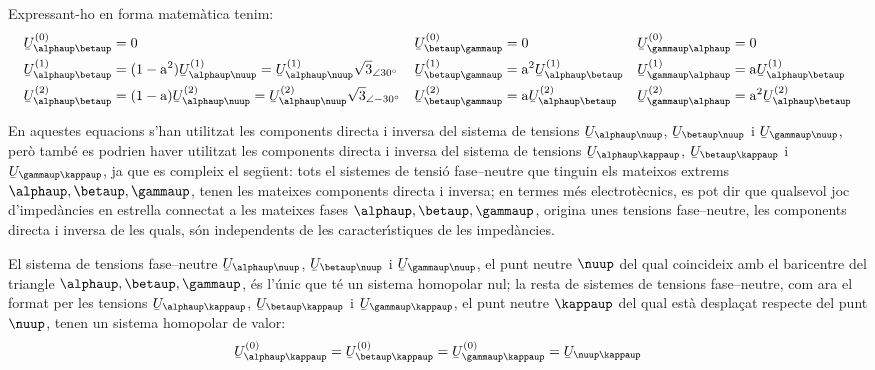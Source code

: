 Expressant-ho en forma matem\`{a}tica tenim:
\begin{subequations}
\begin{align}
   \cmplx{U}_{\alphaup\betaup}\ap{(0)} &= 0 &
   \cmplx{U}_{\betaup\gammaup}\ap{(0)} &= 0 &
   \cmplx{U}_{\gammaup\alphaup}\ap{(0)} &= 0 \\
   \cmplx{U}_{\alphaup\betaup}\ap{(1)} &= (1-\au^2) \cmplx{U}_{\alphaup\nuup}\ap{(1)} =
   \cmplx{U}_{\alphaup\nuup}\ap{(1)} \sqrt{3}_{\angle 30\degree} &
   \cmplx{U}_{\betaup\gammaup}\ap{(1)} &= \au^2 \cmplx{U}_{\alphaup\betaup}\ap{(1)} &
   \cmplx{U}_{\gammaup\alphaup}\ap{(1)} &= \au \cmplx{U}_{\alphaup\betaup}\ap{(1)} \label{eq:c_sim_a3} \\
   \cmplx{U}_{\alphaup\betaup}\ap{(2)} &= (1-\au) \cmplx{U}_{\alphaup\nuup}\ap{(2)}  =
   \cmplx{U}_{\alphaup\nuup}\ap{(2)} \sqrt{3}_{\angle -30\degree}&
   \cmplx{U}_{\betaup\gammaup}\ap{(2)} &= \au \cmplx{U}_{\alphaup\betaup}\ap{(2)} &
   \cmplx{U}_{\gammaup\alphaup}\ap{(2)} &= \au^2 \cmplx{U}_{\alphaup\betaup}\ap{(2)} \label{eq:c_sim_b3}
\end{align}
\end{subequations}

En aquestes equacions s'han utilitzat les components directa i
inversa del sistema de tensions
$\cmplx{U}_{\alphaup\nuup}$, $\cmplx{U}_{\betaup\nuup}$ i $\cmplx{U}_{\gammaup\nuup}$,
per\`{o} tamb\'{e} es podrien haver utilitzat les components directa i
inversa del sistema de tensions
$\cmplx{U}_{\alphaup\kappaup}$, $\cmplx{U}_{\betaup\kappaup}$ i $\cmplx{U}_{\gammaup\kappaup}$,
ja que es compleix el seg\"{u}ent: tots el sistemes de tensi\'{o}
fase--neutre que tinguin els mateixos extrems $\alphaup, \betaup,
\gammaup$, tenen les mateixes components directa i inversa; en termes
m\'{e}s electrot\`{e}cnics, es pot dir que qualsevol joc d'imped\`{a}ncies en
estrella connectat a les mateixes fases $\alphaup, \betaup, \gammaup$,
origina unes tensions fase--neutre, les components directa i inversa
de les quals, s\'{o}n independents de les caracter\'{\i}stiques de les
imped\`{a}ncies.

El sistema de tensions fase--neutre
$\cmplx{U}_{\alphaup\nuup}$, $\cmplx{U}_{\betaup\nuup}$ i $\cmplx{U}_{\gammaup\nuup}$,
el punt neutre $\nuup$ del qual coincideix amb el baricentre del
triangle $\alphaup, \betaup,
 \gammaup$, \'{e}s l'\'{u}nic que t\'{e} un sistema homopolar nul; la resta de sistemes de tensions
 fase--neutre, com ara el format per les tensions $\cmplx{U}_{\alphaup\kappaup}$, $\cmplx{U}_{\betaup\kappaup}$ i $\cmplx{U}_{\gammaup\kappaup}$,
 el punt neutre $\kappaup$ del qual est\`{a} despla\c{c}at respecte del punt $\nuup$, tenen un sistema
 homopolar de valor:
\begin{equation}
    \cmplx{U}_{\alphaup\kappaup}\ap{(0)} = \cmplx{U}_{\betaup\kappaup}\ap{(0)} =
    \cmplx{U}_{\gammaup\kappaup}\ap{(0)} = \cmplx{U}_{\nuup\kappaup}
\end{equation}


